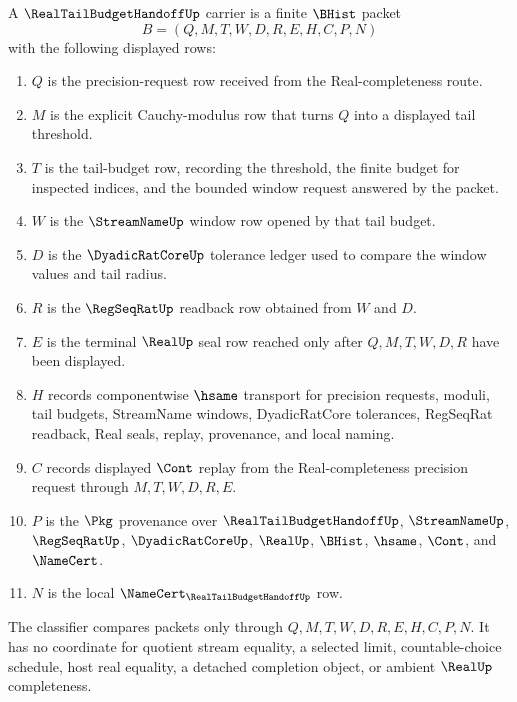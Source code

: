 \begin{definition}
\label{def:real-tail-budget-handoff-carrier}
A $\RealTailBudgetHandoffUp$ carrier is a finite $\BHist$ packet
$$
B=(Q,M,T,W,D,R,E,H,C,P,N)
$$
with the following displayed rows:
\begin{enumerate}
\item $Q$ is the precision-request row received from the Real-completeness route.
\item $M$ is the explicit Cauchy-modulus row that turns $Q$ into a displayed tail threshold.
\item $T$ is the tail-budget row, recording the threshold, the finite budget for inspected indices, and the bounded window request answered by the packet.
\item $W$ is the $\StreamNameUp$ window row opened by that tail budget.
\item $D$ is the $\DyadicRatCoreUp$ tolerance ledger used to compare the window values and tail radius.
\item $R$ is the $\RegSeqRatUp$ readback row obtained from $W$ and $D$.
\item $E$ is the terminal $\RealUp$ seal row reached only after $Q,M,T,W,D,R$ have been displayed.
\item $H$ records componentwise $\hsame$ transport for precision requests, moduli, tail budgets, StreamName windows, DyadicRatCore tolerances, RegSeqRat readback, Real seals, replay, provenance, and local naming.
\item $C$ records displayed $\Cont$ replay from the Real-completeness precision request through $M,T,W,D,R,E$.
\item $P$ is the $\Pkg$ provenance over $\RealTailBudgetHandoffUp$, $\StreamNameUp$, $\RegSeqRatUp$, $\DyadicRatCoreUp$, $\RealUp$, $\BHist$, $\hsame$, $\Cont$, and $\NameCert$.
\item $N$ is the local $\NameCert_{\RealTailBudgetHandoffUp}$ row.
\end{enumerate}
The classifier compares packets only through $Q,M,T,W,D,R,E,H,C,P,N$. It has no coordinate for quotient stream equality, a selected limit, countable-choice schedule, host real equality, a detached completion object, or ambient $\RealUp$ completeness.
\end{definition}

